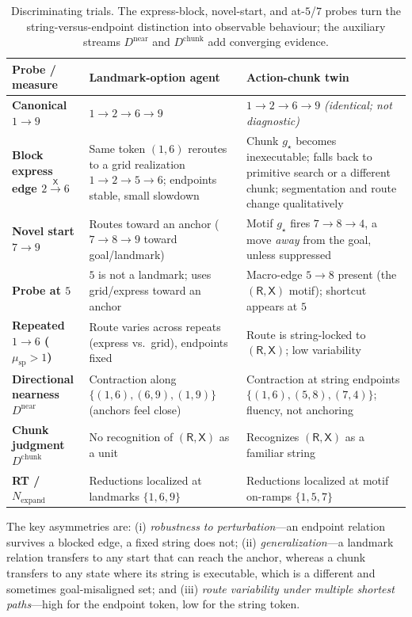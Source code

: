 \documentclass[11pt]{article}
\begin{document}
\begin{table}[htbp]
\centering\small
\begin{tabularx}{\textwidth}{p{3.1cm}YY}
\toprule
Probe / measure & Landmark-option agent & Action-chunk twin \\
\midrule
\textbf{Canonical $1\!\to\!9$} &
$1\!\to\!2\!\to\!6\!\to\!9$ &
$1\!\to\!2\!\to\!6\!\to\!9$ \emph{(identical; not diagnostic)} \\
\textbf{Block express edge $2\!\xrightarrow{\mathsf X}\!6$} &
Same token $(1,6)$ reroutes to a grid realization $1\!\to\!2\!\to\!5\!\to\!6$; endpoints
stable, small slowdown &
Chunk $g_\star$ becomes inexecutable; falls back to primitive search or a different chunk;
segmentation and route change qualitatively \\
\textbf{Novel start $7\!\to\!9$} &
Routes toward an anchor ($7\!\to\!8\!\to\!9$ toward goal/landmark) &
Motif $g_\star$ fires $7\!\to\!8\!\to\!4$, a move \emph{away} from the goal, unless
suppressed \\
\textbf{Probe at $5$} &
$5$ is not a landmark; uses grid/express toward an anchor &
Macro-edge $5\!\to\!8$ present (the $(\mathsf R,\mathsf X)$ motif); shortcut appears at $5$ \\
\textbf{Repeated $1\!\to\!6$ ($\mu_{\mathrm{sp}}>1$)} &
Route varies across repeats (express vs.\ grid), endpoints fixed &
Route is string-locked to $(\mathsf R,\mathsf X)$; low variability \\
\textbf{Directional nearness $D^{\mathrm{near}}$} &
Contraction along $\{(1,6),(6,9),(1,9)\}$ (anchors feel close) &
Contraction at string endpoints $\{(1,6),(5,8),(7,4)\}$; fluency, not anchoring \\
\textbf{Chunk judgment $D^{\mathrm{chunk}}$} &
No recognition of $(\mathsf R,\mathsf X)$ as a unit &
Recognizes $(\mathsf R,\mathsf X)$ as a familiar string \\
\textbf{RT / $N_{\mathrm{expand}}$} &
Reductions localized at landmarks $\{1,6,9\}$ &
Reductions localized at motif on-ramps $\{1,5,7\}$ \\
\bottomrule
\end{tabularx}
\caption{Discriminating trials. The express-block, novel-start, and at-$5$/$7$ probes turn
the string-versus-endpoint distinction into observable behaviour; the auxiliary streams
$D^{\mathrm{near}}$ and $D^{\mathrm{chunk}}$ add converging evidence.}
\label{tab:discriminate}
\end{table}

The key asymmetries are: (i) \emph{robustness to perturbation}---an endpoint relation
survives a blocked edge, a fixed string does not; (ii) \emph{generalization}---a landmark
relation transfers to any start that can reach the anchor, whereas a chunk transfers to any
state where its string is executable, which is a different and sometimes goal-misaligned
set; and (iii) \emph{route variability under multiple shortest paths}---high for the
endpoint token, low for the string token.
\end{document}
